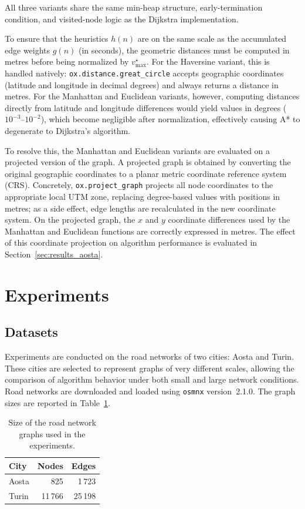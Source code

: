 \documentclass[12pt,a4paper]{article}
\begin{document}
All three variants share the same min-heap structure, early-termination condition, and visited-node logic as the Dijkstra implementation.

To ensure that the heuristics $h(n)$ are on the same scale as the accumulated edge weights $g(n)$ (in seconds), the geometric distances must be computed in metres before being normalized by $v_{\max}^{\star}$.
For the Haversine variant, this is handled natively: \texttt{ox.distance.great\_circle} accepts geographic coordinates (latitude and longitude in decimal degrees) and always returns a distance in metres.
For the Manhattan and Euclidean variants, however, computing distances directly from latitude and longitude differences would yield values in degrees ($10^{-3}$--$10^{-2}$), which become negligible after normalization, effectively causing A* to degenerate to Dijkstra's algorithm.

To resolve this, the Manhattan and Euclidean variants are evaluated on a projected version of the graph.
A projected graph is obtained by converting the original geographic coordinates to a planar metric coordinate reference system (CRS).
Concretely, \texttt{ox.project\_graph} projects all node coordinates to the appropriate local UTM zone, replacing degree-based values with positions in metres; as a side effect, edge lengths are recalculated in the new coordinate system.
On the projected graph, the $x$ and $y$ coordinate differences used by the Manhattan and Euclidean functions are correctly expressed in metres.
The effect of this coordinate projection on algorithm performance is evaluated in Section~\ref{sec:results_aosta}.

\section{Experiments}

\subsection{Datasets}

Experiments are conducted on the road networks of two cities: Aosta and Turin.
These cities are selected to represent graphs of very different scales, allowing the comparison of algorithm behavior under both small and large network conditions.
Road networks are downloaded and loaded using \texttt{osmnx} version~2.1.0.
The graph sizes are reported in Table~\ref{tab:graphs}.

\begin{table}[H]
  \centering
  \begin{tabular}{lrr}
    \toprule
    \textbf{City} & \textbf{Nodes} & \textbf{Edges} \\
    \midrule
    Aosta  &     825 &      1\,723 \\
    Turin  & 11\,766 &  25\,198    \\
    \bottomrule
  \end{tabular}
  \caption{Size of the road network graphs used in the experiments.}
  \label{tab:graphs}
\end{table}
\end{document}
